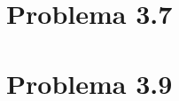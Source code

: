 \documentclass{article}
\begin{document}

\section*{Problema 3.7}

% 
% 
% 
% 
% 

\section*{Problema 3.9}

% 
% 
\end{document}
